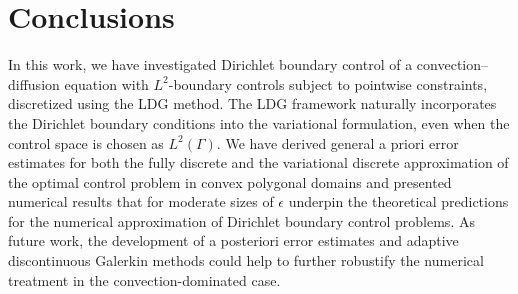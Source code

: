 \documentclass[a4paper,10pt]{article}
\numberwithin{theorem}{section}
\newcommand{\x}[2][blue]{#2}
\begin{document}
\section{Conclusions}\label{sec:conclusion} 

In this work, we have investigated Dirichlet boundary control of a convection--diffusion equation with $L^2$-boundary controls subject to pointwise constraints, discretized using the LDG method. The LDG framework naturally incorporates the Dirichlet boundary conditions into the variational formulation, even when the control space is chosen as $L^2(\Gamma)$. We have derived \x{general a priori} error estimates for both the fully discrete and the variational discrete approximation of the optimal control problem in convex polygonal domains and presented numerical results that for moderate sizes of $\epsilon$ underpin the theoretical predictions \x{for the numerical approximation of Dirichlet boundary control problems}. As future work, the development of a posteriori error estimates and adaptive discontinuous Galerkin methods could help to further robustify the numerical treatment in the convection-dominated case.





%
%
\end{document}
